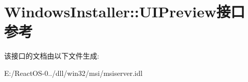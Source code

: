 \hypertarget{interface_windows_installer_1_1_u_i_preview}{}\section{Windows\+Installer\+:\+:U\+I\+Preview接口 参考}
\label{interface_windows_installer_1_1_u_i_preview}


该接口的文档由以下文件生成\+:\begin{DoxyCompactItemize}
\item 
E\+:/\+React\+O\+S-\/0../dll/win32/msi/msiserver.\+idl\end{DoxyCompactItemize}
